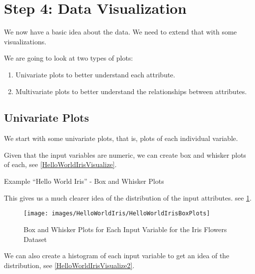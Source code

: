     
\section{Step 4: Data Visualization}

We now have a basic idea about the data. We need to extend that with some visualizations.
    
We are going to look at two types of plots:

\begin{enumerate}
  \item Univariate plots to better understand each attribute.
  \item Multivariate plots to better understand the relationships between attributes.
\end{enumerate}    

\subsection{Univariate Plots}

We start with some univariate plots, that is, plots of each individual variable.
    
Given that the input variables are numeric, we can create box and whisker plots of each, see \ref{HelloWorldIrisVisualize}.


\begin{code}
      
    
  \caption{Example ``Hello World Iris'' - Box and Whisker Plots} \label{HelloWorldIrisVisualize}
\end{code}      
    
This gives us a much clearer idea of the distribution of the input attributes. see \ref{HelloWorldIrisBoxPlots}.
  

\begin{figure}
  \centering
    
  \texttt{[image: images/HelloWorldIris/HelloWorldIrisBoxPlots]}

  \caption{Box and Whisker Plots for Each Input Variable for the Iris Flowers Dataset}\label{HelloWorldIrisBoxPlots}
\end{figure}    
    
We can also create a histogram of each input variable to get an idea of the distribution, see \ref{HelloWorldIrisVisualize2}.
    
